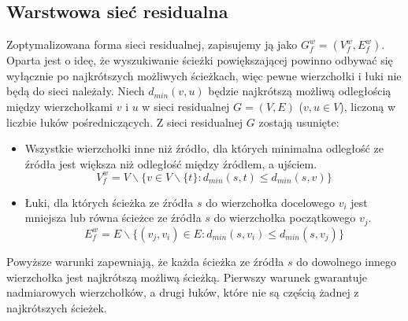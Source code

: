 \subsection{Warstwowa sieć residualna}\label{ssec:WSR}
Zoptymalizowana forma sieci residualnej, zapisujemy ją jako $ G_f^w=(V_f^w,E_f^w) $. Oparta jest o ideę, że wyszukiwanie ścieżki powiększającej powinno odbywać się wyłącznie po najkrótszych możliwych ścieżkach, więc pewne wierzchołki i łuki nie będą do sieci należały. Niech $ d_{min}(v,u) $ będzie najkrótszą możliwą odległością między wierzchołkami $ v $ i $ u $ w sieci residualnej $ G=(V,E) $ ($ v,u\in V $), liczoną w liczbie łuków pośredniczących. Z sieci residualnej $ G $ zostają usunięte:
\begin{itemize}
	\item Wszystkie wierzchołki inne niż źródło, dla których minimalna odległość ze źródła jest większa niż odległość między źródłem, a ujściem.
	$$ V_f^w=V\backslash\{v\in V\backslash\{t\} : d_{min}(s,t)\le d_{min}(s,v)\} $$
	\item Łuki, dla których ścieżka ze źródła $ s $ do wierzchołka docelowego $ v_i $ jest mniejsza lub równa ścieżce ze źródła $ s $ do wierzchołka początkowego $ v_j $.
	$$ E_f^w=E\backslash\{(v_j,v_i)\in E : d_{min}(s,v_i)\le d_{min}(s,v_j)\} $$	
\end{itemize}
Powyższe warunki zapewniają, że każda ścieżka ze źródła $ s $ do dowolnego innego wierzchołka jest najkrótszą możliwą ścieżką. Pierwszy warunek gwarantuje nadmiarowych wierzchołków, a drugi łuków, które nie są częścią żadnej z najkrótszych ścieżek.
